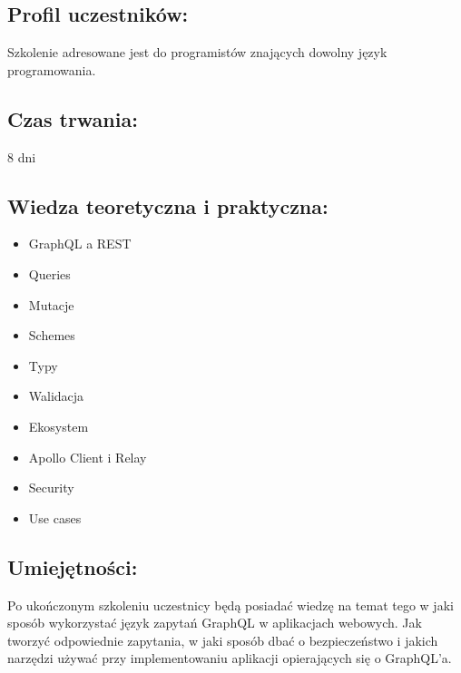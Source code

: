 \documentclass{article}[10pt]
\begin{document}
	\subsection*{Profil uczestników:}
\begin{adjustwidth}{2cm}{}
\justifying
	
Szkolenie adresowane jest do programistów znających dowolny język programowania.
\end{adjustwidth}
	\subsection*{Czas trwania:}
\begin{adjustwidth}{2cm}{}
	8 dni
\end{adjustwidth}

	\subsection*{Wiedza teoretyczna i praktyczna:}
\begin{adjustwidth}{1.5cm}{}
	\begin{itemize}
		\item GraphQL a REST
		\item Queries
		\item Mutacje
		\item Schemes
		\item Typy
		\item Walidacja
		\item Ekosystem
		\item Apollo Client i Relay
		\item Security
		\item Use cases
	\end{itemize}
\end{adjustwidth}

	\subsection*{Umiejętności:}
\begin{adjustwidth}{2cm}{}
\justifying
	
Po ukończonym szkoleniu uczestnicy będą posiadać wiedzę na temat tego w jaki sposób wykorzystać język zapytań GraphQL w aplikacjach webowych. Jak tworzyć odpowiednie zapytania, w jaki sposób dbać o bezpieczeństwo i jakich narzędzi używać przy implementowaniu aplikacji opierających się o GraphQL’a.



\end{adjustwidth}
\end{document}
